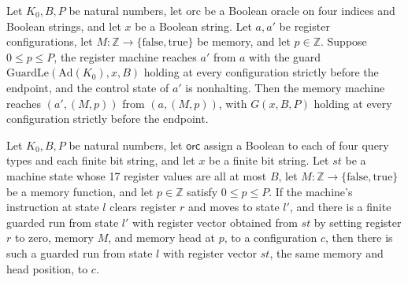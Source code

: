 \begin{lemma}
\label{Complexity.LogProg.ExpBFS.of_areach}
\leanok
{}
Let $K_0,B,P$ be natural numbers, let $\mathrm{orc}$ be a Boolean oracle on four indices
and Boolean strings, and let $x$ be a Boolean string. Let $a,a'$ be register
configurations, let $M:\mathbb{Z}\to\{\mathrm{false},\mathrm{true}\}$ be memory, and let
$p\in\mathbb{Z}$. Suppose $0\le p\le P$, the register machine reaches $a'$ from $a$ with
the guard $\mathrm{GuardLe}(\mathrm{Ad}(K_0),x,B)$ holding at every configuration
strictly before the endpoint, and the control state of $a'$ is nonhalting. Then the
memory machine reaches $(a',(M,p))$ from $(a,(M,p))$, with $G(x,B,P)$ holding at every
configuration strictly before the endpoint.
\end{lemma}

\begin{lemma}
\label{Complexity.LogProg.ExpBFS.clr_step}
\leanok
{}
Let $K_0,B,P$ be natural numbers, let $\mathsf{orc}$ assign a Boolean to each of four
query types and each finite bit string, and let $x$ be a finite bit string. Let $st$ be
a machine state whose 17 register values are all at most $B$, let $M:\mathbb
Z\to\{\mathrm{false},\mathrm{true}\}$ be a memory function, and let $p\in\mathbb Z$
satisfy $0\le p\le P$. If the machine's instruction at state $l$ clears register $r$ and
moves to state $l'$, and there is a finite guarded run from state $l'$ with register
vector obtained from $st$ by setting register $r$ to zero, memory $M$, and memory head
at $p$, to a configuration $c$, then there is such a guarded run from state $l$ with
register vector $st$, the same memory and head position, to $c$.
\end{lemma}

